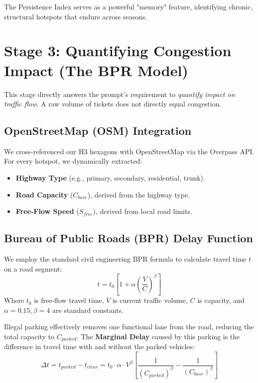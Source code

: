 \documentclass[12pt,a4paper]{article}
\begin{document}
The Persistence Index serves as a powerful "memory" feature, identifying chronic, structural hotspots that endure across seasons.

\section{Stage 3: Quantifying Congestion Impact (The BPR Model)}

This stage directly answers the prompt's requirement to \textit{quantify impact on traffic flow}. A raw volume of tickets does not directly equal congestion.

\subsection{OpenStreetMap (OSM) Integration}
We cross-referenced our H3 hexagons with OpenStreetMap via the Overpass API. For every hotspot, we dynamically extracted:
\begin{itemize}
    \item \textbf{Highway Type} (e.g., primary, secondary, residential, trunk).
    \item \textbf{Road Capacity} ($C_{base}$), derived from the highway type.
    \item \textbf{Free-Flow Speed} ($S_{free}$), derived from local road limits.
\end{itemize}

\subsection{Bureau of Public Roads (BPR) Delay Function}
We employ the standard civil engineering BPR formula to calculate travel time $t$ on a road segment:
\begin{equation}
    t = t_0 \left[ 1 + \alpha \left( \frac{V}{C} \right)^\beta \right]
\end{equation}
Where $t_0$ is free-flow travel time, $V$ is current traffic volume, $C$ is capacity, and $\alpha=0.15, \beta=4$ are standard constants.

Illegal parking effectively removes one functional lane from the road, reducing the total capacity to $C_{parked}$. The \textbf{Marginal Delay} caused by this parking is the difference in travel time with and without the parked vehicles:
\begin{equation}
    \Delta t = t_{parked} - t_{clear} = t_0 \cdot \alpha \cdot V^\beta \left[ \frac{1}{(C_{parked})^\beta} - \frac{1}{(C_{base})^\beta} \right]
\end{equation}
\end{document}
